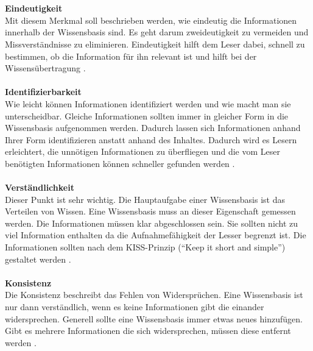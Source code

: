 \documentclass[a4paper,12pt,twoside]{scrartcl}
\begin{document}
\\\\
\textbf{Eindeutigkeit}\\
Mit diesem Merkmal soll beschrieben werden, wie eindeutig die Informationen innerhalb der Wissensbasis sind. Es geht darum zweideutigkeit zu vermeiden und Missverständnisse zu eliminieren. Eindeutigkeit hilft dem Leser dabei, schnell zu bestimmen, ob die Information für ihn relevant ist und hilft bei der Wissensübertragung \cite{Prause2013}.
\\\\
\textbf{Identifizierbarkeit}\\
Wie leicht können Informationen identifiziert werden und wie macht man sie unterscheidbar. Gleiche Informationen sollten immer in gleicher Form in die Wissensbasis aufgenommen werden. Dadurch lassen sich Informationen anhand Ihrer Form identifizieren anstatt anhand des Inhaltes. Dadurch wird es Lesern erleichtert, die unnötigen Informationen zu überfliegen und die vom Leser benötigten Informationen können schneller gefunden werden \cite{Prause2013}.
\\\\
\textbf{Verständlichkeit}\\
Dieser Punkt ist sehr wichtig. Die Hauptaufgabe einer Wissensbasis ist das Verteilen von Wissen. Eine Wissensbasis muss an dieser Eigenschaft gemessen werden. Die Informationen müssen klar abgeschlossen sein. Sie sollten nicht zu viel Information enthalten da die Aufnahmefähigkeit der Lesser begrenzt ist. Die Informationen sollten nach dem KISS-Prinzip (“Keep it short and simple”) gestaltet werden \cite{Prause2013}.
\\\\
\textbf{Konsistenz}\\
Die Konsistenz beschreibt das Fehlen von Widersprüchen. Eine Wissensbasis ist nur dann verständlich, wenn es keine Informationen gibt die einander widersprechen. Generell sollte eine Wissensbasis immer etwas neues hinzufügen. Gibt es mehrere Informationen die sich widersprechen, müssen diese entfernt werden \cite{Prause2013}.
\end{document}
